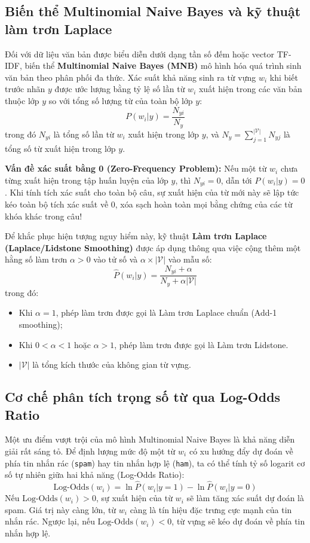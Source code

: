 \subsection{Biến thể Multinomial Naive Bayes và kỹ thuật làm trơn Laplace}
Đối với dữ liệu văn bản được biểu diễn dưới dạng tần số đếm hoặc vector TF-IDF, biến thể \textbf{Multinomial Naive Bayes (MNB)} mô hình hóa quá trình sinh văn bản theo phân phối đa thức.
Xác suất khả năng sinh ra từ vựng $w_i$ khi biết trước nhãn $y$ được ước lượng bằng tỷ lệ số lần từ $w_i$ xuất hiện trong các văn bản thuộc lớp $y$ so với tổng số lượng từ của toàn bộ lớp $y$:
\begin{equation}
P(w_i | y) = \frac{N_{yi}}{N_y}
\end{equation}
trong đó $N_{yi}$ là tổng số lần từ $w_i$ xuất hiện trong lớp $y$, và $N_y = \sum_{j=1}^{|\mathcal{V}|} N_{yj}$ là tổng số từ xuất hiện trong lớp $y$.

\textbf{Vấn đề xác suất bằng 0 (Zero-Frequency Problem):} Nếu một từ $w_i$ chưa từng xuất hiện trong tập huấn luyện của lớp $y$, thì $N_{yi} = 0$, dẫn tới $P(w_i | y) = 0$. Khi tính tích xác suất cho toàn bộ câu, sự xuất hiện của từ mới này sẽ lập tức kéo toàn bộ tích xác suất về $0$, xóa sạch hoàn toàn mọi bằng chứng của các từ khóa khác trong câu!

Để khắc phục hiện tượng nguy hiểm này, kỹ thuật \textbf{Làm trơn Laplace (Laplace/Lidstone Smoothing)} được áp dụng thông qua việc cộng thêm một hằng số làm trơn $\alpha > 0$ vào tử số và $\alpha \times |\mathcal{V}|$ vào mẫu số:
\begin{equation}
\label{eq:laplace-smoothing}
\hat{P}(w_i | y) = \frac{N_{yi} + \alpha}{N_y + \alpha |\mathcal{V}|}
\end{equation}
trong đó:
\begin{itemize}
    \item Khi $\alpha = 1$, phép làm trơn được gọi là Làm trơn Laplace chuẩn (Add-1 smoothing);
    \item Khi $0 < \alpha < 1$ hoặc $\alpha > 1$, phép làm trơn được gọi là Làm trơn Lidstone.
    \item $|\mathcal{V}|$ là tổng kích thước của không gian từ vựng.
\end{itemize}

\subsection{Cơ chế phân tích trọng số từ qua Log-Odds Ratio}
Một ưu điểm vượt trội của mô hình Multinomial Naive Bayes là khả năng diễn giải rất sáng tỏ. Để định lượng mức độ một từ $w_i$ có xu hướng đẩy dự đoán về phía tin nhắn rác (\texttt{spam}) hay tin nhắn hợp lệ (\texttt{ham}), ta có thể tính tỷ số logarit cơ số tự nhiên giữa hai khả năng (Log-Odds Ratio):
\begin{equation}
\label{eq:log-odds}
\text{Log-Odds}(w_i) = \ln \hat{P}(w_i | y=1) - \ln \hat{P}(w_i | y=0)
\end{equation}
Nếu $\text{Log-Odds}(w_i) > 0$, sự xuất hiện của từ $w_i$ sẽ làm tăng xác suất dự đoán là spam. Giá trị này càng lớn, từ $w_i$ càng là tín hiệu đặc trưng cực mạnh của tin nhắn rác. Ngược lại, nếu $\text{Log-Odds}(w_i) < 0$, từ vựng sẽ kéo dự đoán về phía tin nhắn hợp lệ.


